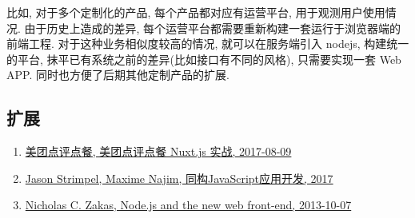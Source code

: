 比如, 对于多个定制化的产品, 每个产品都对应有运营平台,
用于观测用户使用情况. 由于历史上造成的差异,
每个运营平台都需要重新构建一套运行于浏览器端的前端工程.
对于这种业务相似度较高的情况, 就可以在服务端引入 nodejs, 构建统一的平台,
抹平已有系统之前的差异(比如接口有不同的风格), 只需要实现一套 Web APP.
同时也方便了后期其他定制产品的扩展.

\subsection{扩展}\label{ux6269ux5c55}

\begin{enumerate}
\def\labelenumi{\arabic{enumi}.}
\tightlist
\item
  \href{https://juejin.im/post/598aabe96fb9a03c335a8dde}{美团点评点餐,
  美团点评点餐 Nuxt.js 实战, 2017-08-09}
\item
  \href{https://book.douban.com/subject/27183584/}{Jason Strimpel,
  Maxime Najim, 同构JavaScript应用开发, 2017}
\item
  \href{https://www.nczonline.net/blog/2013/10/07/node-js-and-the-new-web-front-end/}{Nicholas
  C. Zakas, Node.js and the new web front-end, 2013-10-07}
\end{enumerate}
